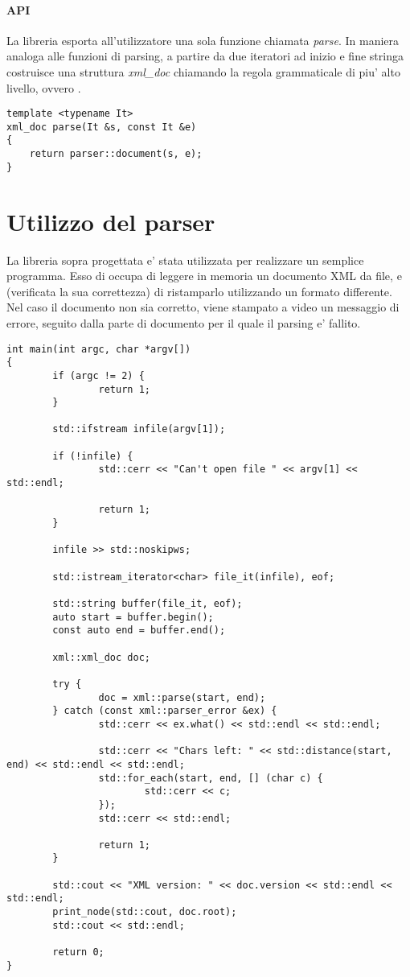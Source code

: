 \documentclass[italian,a4paper]{article}
\begin{document}
\subsection{API}

La libreria esporta all'utilizzatore una sola funzione chiamata \emph{parse}. In
maniera analoga alle funzioni di parsing, a partire da due iteratori ad inizio e
fine stringa costruisce una struttura \emph{xml\_doc} chiamando la regola
grammaticale di piu' alto livello, ovvero .

\begin{verbatim}
template <typename It>
xml_doc parse(It &s, const It &e)
{
	return parser::document(s, e);
}
\end{verbatim}

\part{Utilizzo del parser}

La libreria sopra progettata e' stata utilizzata per realizzare un semplice
programma. Esso di occupa di leggere in memoria un documento XML da file, e
(verificata la sua correttezza) di ristamparlo utilizzando un formato
differente. Nel caso il documento non sia corretto, viene stampato a video un
messaggio di errore, seguito dalla parte di documento per il quale il parsing e'
fallito.

\begin{verbatim}
int main(int argc, char *argv[])
{
        if (argc != 2) {
                return 1;
        }   

        std::ifstream infile(argv[1]);

        if (!infile) {
                std::cerr << "Can't open file " << argv[1] << std::endl;

                return 1;
        }   

        infile >> std::noskipws;

        std::istream_iterator<char> file_it(infile), eof;

        std::string buffer(file_it, eof);
        auto start = buffer.begin();
        const auto end = buffer.end();

        xml::xml_doc doc;

        try {
                doc = xml::parse(start, end);
        } catch (const xml::parser_error &ex) {
                std::cerr << ex.what() << std::endl << std::endl;

                std::cerr << "Chars left: " << std::distance(start, end) << std::endl << std::endl;
                std::for_each(start, end, [] (char c) {
                        std::cerr << c;
                }); 
                std::cerr << std::endl;

                return 1;
        }   

        std::cout << "XML version: " << doc.version << std::endl << std::endl;
        print_node(std::cout, doc.root);
        std::cout << std::endl;

        return 0;
}
\end{verbatim}
\end{document}
